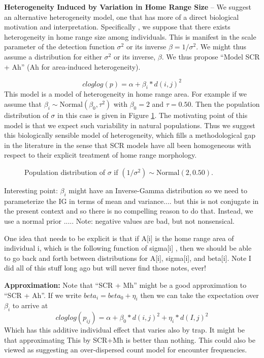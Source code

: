 {\bf Heterogeneity Induced by Variation in Home Range Size} -- We suggest an alternative heterogeneity model, one that has more of a direct biological motivation and interpretation. Specifically , we suppose that there exists heterogeneity in home range size among individuals. This is manifest in the scale parameter of the detection function $\sigma^{2}$ or its inverse $\beta = 1/\sigma^{2}$. We might
thus assume a distribution for either $\sigma^{2}$ or its inverse,
$\beta$.  We thus propose ``Model SCR + Ah'' (Ah for area-induced
heterogeneity).

\[
 cloglog(p) = \alpha + \beta_{i}*d(i,j)^2 
\]  
This model is a model of heterogeneity in home range area. For example if we assume that $\beta_{i} \sim \mbox{Normal}(\beta_0,\tau^{2})$ with $\beta_{0} = 2$ and $\tau = 0.50$. Then the population distribution of $\sigma$ in this case is given in Figure \ref{fig.one}. The motivating point of this model is that  we expect such variability in natural populations. Thus we suggest this biologically sensible model of heterogeneity, which fills a methodological gap in the literature in the sense that SCR models have all been homogeneous with respect to their explicit treatment of home range morphology.

\begin{figure}[ht]
\centerline{}
\caption{
Population distribution of $\sigma$ if $(1/\sigma^{2}) \sim \mbox{Normal}(2, 0.50)$.
}
\label{fig.one}
\end{figure}

Interesting point: $\beta_{i}$ might have an Inverse-Gamma
distribution so we need to parameterize the IG in terms of mean and
variance.... but this is not conjugate in the present context and so
there is no compelling reason to do that. Instead, we use a normal
prior ..... Note: negative values are bad, but not nonsensical.

One idea that needs to be explicit is that if A[i] is the home range area of individual i, which is the following function of sigma[i] ,  then we should be able to go back and forth between distributions for A[i], sigma[i], and beta[i]. Note I did all of this stuff long ago but will never find those notes, ever!


{\bf Approximation: }
Note that ``SCR + Mh'' might be a good approximation to ``SCR + Ah''.  If we write $beta_{i} =
beta_{0} + \eta_{i}$ then
we can take the expectation over  $\beta_{i}$ to arrive at 
\[ 
 cloglog(p_{ij} ) = \alpha + \beta_{0}*d(i,j)^2 +  \eta_{i}*d(I,j)^2
\]
Which has this additive individual effect that varies also by trap. It might be that approximating
This by SCR+Mh is better than nothing.
This could also be viewed as suggesting an over-dispersed count model for encounter frequencies.  
  
